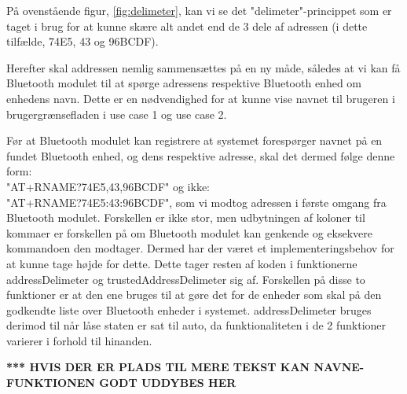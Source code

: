 På ovenstående figur, \ref{fig:delimeter}, kan vi se det "delimeter"-princippet som er taget i brug for at kunne skære alt andet end de 3 dele af adressen (i dette tilfælde, 74E5, 43 og 96BCDF).

Herefter skal addressen nemlig sammensættes på en ny måde, således at vi kan få Bluetooth modulet til at spørge adressens respektive Bluetooth enhed om enhedens navn. Dette er en nødvendighed for at kunne vise navnet til brugeren i brugergrænsefladen i use case 1 og use case 2.

Før at Bluetooth modulet kan registrere at systemet forespørger navnet på en fundet Bluetooth enhed, og dens respektive adresse, skal det dermed følge denne form:\\ "AT+RNAME?74E5,43,96BCDF" og ikke:\\ "AT+RNAME?74E5:43:96BCDF", som vi modtog adressen i første omgang fra Bluetooth modulet. Forskellen er ikke stor, men udbytningen af koloner til kommaer er forskellen på om Bluetooth modulet kan genkende og eksekvere kommandoen den modtager. Dermed har der været et implementeringsbehov for at kunne tage højde for dette. Dette tager resten af koden i funktionerne addressDelimeter og trustedAddressDelimeter sig af. Forskellen på disse to funktioner er at den ene bruges til at gøre det for de enheder som skal på den godkendte liste over Bluetooth enheder i systemet. addressDelimeter bruges derimod til når låse staten er sat til auto, da funktionaliteten i de 2 funktioner varierer i forhold til hinanden.

\textbf{*** HVIS DER ER PLADS TIL MERE TEKST KAN NAVNE-FUNKTIONEN GODT UDDYBES HER}

